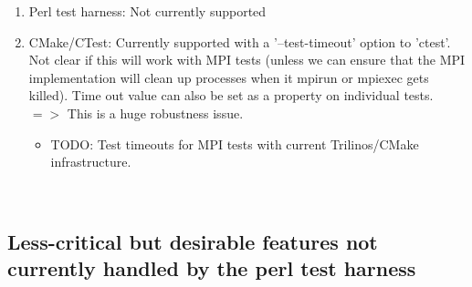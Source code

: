 \documentclass[pdf,ps2pdf,11pt]{SANDreport}
\begin{document}
\begin{enumerate}
\begin{enumerate}
  {}\item Perl test harness: Not currently supported

  {}\item CMake/CTest: Currently supported with a '--test-timeout'
  option to 'ctest'.  Not clear if this will work with MPI tests
  (unless we can ensure that the MPI implementation will clean up
  processes when it mpirun or mpiexec gets killed).  Time out value
  can also be set as a property on individual tests. $=>$ This is a
  huge robustness issue.

    \begin{itemize}
   
    {}\item TODO: Test timeouts for MPI tests with current
    Trilinos/CMake infrastructure.

    \end{itemize}

  \end{enumerate}

\end{enumerate}

\
%
{}\subsection{Less-critical but desirable features not currently handled by
the perl test harness}
%
\end{document}
